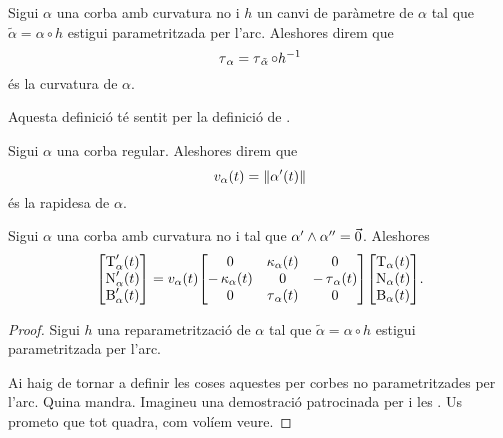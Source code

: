 \documentclass[../Apunts.tex]{subfiles}
\begin{document}
	\begin{definition}
		\label{def:torsió  per una reparametrització}
		Sigui \(\alpha\) una corba amb curvatura no \nulla{} i \(h\) un canvi de paràmetre de \(\alpha\) tal que \(\tilde{\alpha}=\alpha\circ h\) estigui parametritzada per l'arc. Aleshores direm que
		\[\operatorname{\tau}_{\alpha}=\operatorname{\tau}_{\tilde{\alpha}}\circ h^{-1}\]
		és la curvatura de \(\alpha\).
		
		Aquesta definició té sentit per la definició de .
	\end{definition}
	\begin{definition}[Rapidesa]
		\label{def:rapidesa}
		Sigui \(\alpha\) una corba regular. Aleshores direm que
		\[\rapidesa_{\alpha}(t)=\norm{\alpha'(t)}\]
		és la rapidesa de \(\alpha\).
	\end{definition}
	\begin{proposition}
		\label{prop:fórmules de Frenet}
		Sigui \(\alpha\) una corba amb curvatura no \nulla{} i tal que \(\alpha'\mathbin{\wedge}\alpha''=\vec{0}\). Aleshores
		\[\begin{bmatrix}
			\tangent_{\alpha}'(t) \\
			\normal_{\alpha}'(t) \\
			\binormal_{\alpha}'(t)
		\end{bmatrix}
		=\rapidesa_{\alpha}(t)\begin{bmatrix}
			0 & \curvatura_{\alpha}(t) & 0 \\
			-\curvatura_{\alpha}(t) & 0 & -\torsio_{\alpha}(t) \\
			0 & \torsio_{\alpha}(t) & 0
		\end{bmatrix}
		\begin{bmatrix}
			\tangent_{\alpha}(t) \\
			\normal_{\alpha}(t) \\
			\binormal_{\alpha}(t)
		\end{bmatrix}.\]
		\begin{proof}
			Sigui \(h\) una reparametrització de \(\alpha\) tal que \(\tilde{\alpha}=\alpha\circ h\) estigui parametritzada per l'arc.
			
			Ai haig de tornar a definir les coses aquestes per corbes no parametritzades per l'arc. Quina mandra. Imagineu una demostració patrocinada per  i les . Us prometo que tot quadra, com volíem veure.
		\end{proof}
	\end{proposition}
\end{document}
